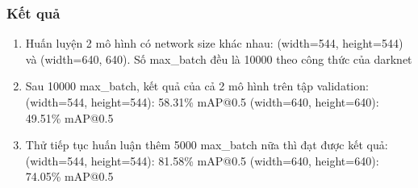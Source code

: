 \documentclass[20pt, a4paper]{article}
\begin{document}
\subsubsection{Kết quả}
\begin{enumerate}
	\item Huấn luyện 2 mô hình có network size khác nhau: (width=544, height=544) và (width=640, 640). Số max\_batch đều là 10000 theo công thức của darknet
	\item Sau 10000 max\_batch, kết quả của cả 2 mô hình trên tập validation: 
		\subitem (width=544, height=544): 58.31\% mAP@0.5
		\subitem (width=640, height=640): 49.51\% mAP@0.5
	\item Thử tiếp tục huấn luận thêm 5000 max\_batch nữa thì đạt được kết quả: 
		\subitem (width=544, height=544): 81.58\% mAP@0.5
		\subitem (width=640, height=640): 74.05\% mAP@0.5


\end{enumerate}
\end{document}
